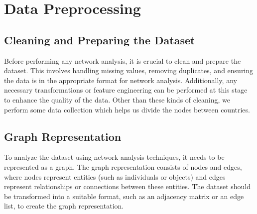\section{Data Preprocessing}

\subsection{Cleaning and Preparing the Dataset}

Before performing any network analysis, it is crucial to clean and prepare the dataset. This involves handling missing values, removing duplicates, and ensuring the data is in the appropriate format for network analysis. Additionally, any necessary transformations or feature engineering can be performed at this stage to enhance the quality of the data. Other than these kinds of cleaning, we perform some data collection which helps us divide the nodes between countries.\cite{geo-names}

\subsection{Graph Representation}

To analyze the dataset using network analysis techniques, it needs to be represented as a graph. The graph representation consists of nodes and edges, where nodes represent entities (such as individuals or objects) and edges represent relationships or connections between these entities. The dataset should be transformed into a suitable format, such as an adjacency matrix or an edge list, to create the graph representation.


